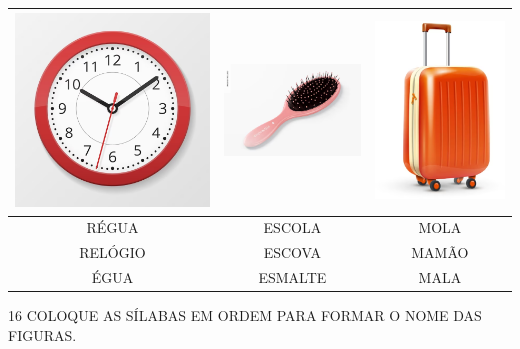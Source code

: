 \begin{center}
\begin{tabular}{ccc}
\multicolumn{1}{l}{\includegraphics[width=.2\textwidth]{media/image74.png}} & \multicolumn{1}{l}{\includegraphics[width=.2\textwidth]{media/image75.png} } & \multicolumn{1}{l}{\includegraphics[width=.2\textwidth]{media/image76.png}} \\ \hline
\multicolumn{1}{|c|}{RÉGUA} & \multicolumn{1}{c|}{ESCOLA} & \multicolumn{1}{c|}{MOLA} \\ \hline
\multicolumn{1}{|c|}{RELÓGIO} & \multicolumn{1}{c|}{ESCOVA} & \multicolumn{1}{c|}{MAMÃO} \\ \hline
\multicolumn{1}{|c|}{ÉGUA} & \multicolumn{1}{c|}{ESMALTE} & \multicolumn{1}{c|}{MALA} \\ \hline
\end{tabular}
\end{center}

\num{16} COLOQUE AS SÍLABAS EM ORDEM PARA FORMAR O NOME DAS FIGURAS.

